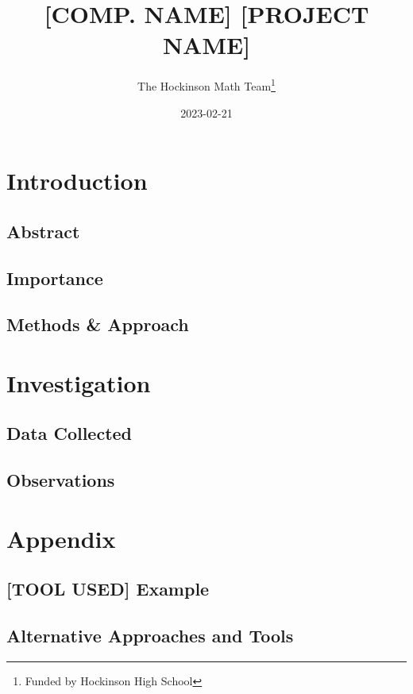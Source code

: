 \documentclass[12pt, letterpaper]{article}
\title{[COMP. NAME] [PROJECT NAME]}
\author{The Hockinson Math Team\thanks{Funded by Hockinson High School}}
\date{2023-02-21}
\begin{document}
\maketitle              %
\tableofcontents        %
\newpage                %

\section{Introduction}

\subsection{Abstract}
\blindtext

\subsection{Importance}
\blindtext
\blindtext

\subsection{Methods \& Approach}
\blindtext

\section{Investigation}

\subsection{Data Collected}
\blindtext
\blindtext
\blindtext
\blindtext

\subsection{Observations}
\blindtext
\blindtext

\section{Appendix}

\subsection{[TOOL USED] Example}
\blindtext
\blindtext
\blindtext

\subsection{Alternative Approaches and Tools}
\blindtext

\end{document}
